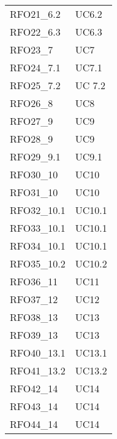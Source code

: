 \begin{longtable}{|C{6cm} C{3cm}|}
    RFO21\_6.2 & UC6.2 \\
    
    RFO22\_6.3 & UC6.3 \\
    
    RFO23\_7 & UC7 \\
    
    RFO24\_7.1 & UC7.1 \\
    
    RFO25\_7.2 & UC 7.2 \\
    
    RFO26\_8 & UC8 \\
    
    RFO27\_9 & UC9 \\
    
    RFO28\_9 & UC9 \\

    RFO29\_9.1 & UC9.1 \\
    
    RFO30\_10 & UC10 \\

    RFO31\_10 & UC10 \\
    
    RFO32\_10.1 & UC10.1 \\
    
    RFO33\_10.1 & UC10.1 \\
    
    RFO34\_10.1 & UC10.1 \\
    
    RFO35\_10.2 & UC10.2 \\
    
    RFO36\_11 & UC11 \\
    
    RFO37\_12 & UC12 \\
    
    RFO38\_13 & UC13 \\
    
    RFO39\_13 & UC13 \\
    
    RFO40\_13.1 & UC13.1 \\
    
    RFO41\_13.2 & UC13.2 \\
    
    RFO42\_14 & UC14 \\
    
    RFO43\_14 & UC14 \\
    
    RFO44\_14 & UC14 \\
    

\end{longtable}
